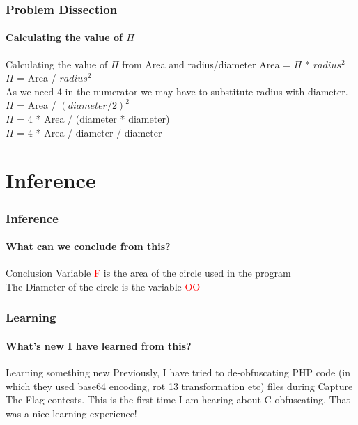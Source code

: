\documentclass[12pt]{beamer}
\begin{document}
\begin{frame}
	\frametitle{Problem Dissection}
	\framesubtitle{Calculating the value of $\Pi$ }
	\begin{block}{Calculating the value of $\Pi$ from Area and radius/diameter}
		Area = $\Pi$ * $radius^{2}$ \\
		$\Pi$ = Area / $radius^{2}$ \\
		As we need 4 in the numerator we may have to substitute radius with diameter.\\
		$\Pi$ = Area / $(diameter/2)^{2}$ \\
		$\Pi$ = 4 * Area / (diameter * diameter) \\
		$\Pi$ = 4 * Area / diameter / diameter \\
	\end{block}
\end{frame}	

\section{Inference}
\begin{frame}
	\frametitle{Inference}
	\framesubtitle{What can we conclude from this?}
	\begin{block}{Conclusion}
		Variable \textcolor{red}{F} is the area of the circle used in the program \\
		The Diameter of the circle is the variable \textcolor{red}{OO}
	\end{block}
\end{frame}

\begin{frame}
	\frametitle{Learning}
	\framesubtitle{What's new I have learned from this?}
	\begin{block}{Learning something new}
		Previously, I have tried to de-obfuscating PHP code (in which they used base64 encoding, rot 13 transformation etc) files during Capture The Flag contests. This is the first time I am hearing about C obfuscating. That was a nice learning experience!
	\end{block}
\end{frame}

\end{document}
